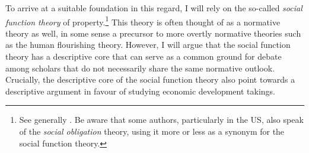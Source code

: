 To arrive at a suitable foundation in this regard, I will rely on the so-called {\it social function theory} of property.\footnote{See generally \cite{foster11,mirow10,alexander09a}. Be aware that some authors, particularly in the US, also speak of the {\it social obligation} theory, using it more or less as a synonym for the social function theory.} This theory is often thought of as a normative theory as well, in some sense a precursor to more overtly normative theories such as the human flourishing theory. However, I will argue that the social function theory has a descriptive core that can serve as a common ground for debate among scholars that do not necessarily share the same normative outlook. Crucially, the descriptive core of the social function theory also point towards a descriptive argument in favour of studying economic development takings.
